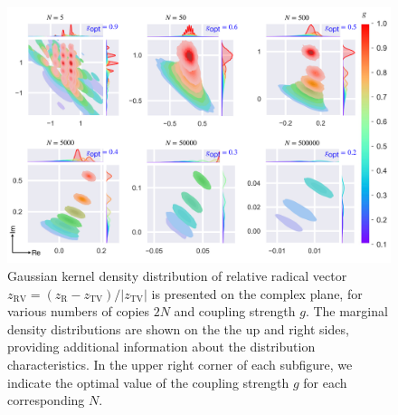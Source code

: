 \documentclass[twocolumn,pra,aps,superscriptaddress]{revtex4-2}
\begin{document}
\begin{figure}
\includegraphics[width=17.2cm]{Fig2.pdf}
\caption{\label{fig:tradeoff}
Gaussian kernel density distribution of relative radical vector $z_{\text{RV}}=\left(z_{\text{R}}-z_{\text{TV}} \right) / |z_{\text{TV}}|$ is presented on the complex plane, for various numbers of copies $2N$ and coupling strength $g$. The marginal density distributions are shown on the the up and right sides, providing additional information about the distribution characteristics. In the upper right corner of each subfigure, we indicate the optimal value of the coupling strength $g$ for each corresponding $N$.}
\end{figure} 
\end{document}
